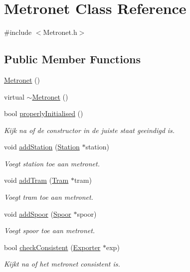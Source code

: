 \hypertarget{class_metronet}{}\section{Metronet Class Reference}
\label{class_metronet}


{\ttfamily \#include $<$Metronet.\+h$>$}

\subsection*{Public Member Functions}
\begin{DoxyCompactItemize}
\item 
\hyperlink{class_metronet_abdd205c39857ed1aabd104a6886cad45}{Metronet} ()
\item 
virtual \hyperlink{class_metronet_afa96be4bf66f8d7dcf3f40a7487d2ea7}{$\sim$\+Metronet} ()
\item 
bool \hyperlink{class_metronet_a3d2adce29a947f162924279b766de645}{properly\+Initialised} ()
\begin{DoxyCompactList}\small\item\em Kijk na of de constructor in de juiste staat geeindigd is. \end{DoxyCompactList}\item 
void \hyperlink{class_metronet_ac7f4069e577cd4dddb1e166923df3ecb}{add\+Station} (\hyperlink{class_station}{Station} $\ast$station)
\begin{DoxyCompactList}\small\item\em Voegt station toe aan metronet. \end{DoxyCompactList}\item 
void \hyperlink{class_metronet_a3a01132772f4a367d83af40a3c02e224}{add\+Tram} (\hyperlink{class_tram}{Tram} $\ast$tram)
\begin{DoxyCompactList}\small\item\em Voegt tram toe aan metronet. \end{DoxyCompactList}\item 
void \hyperlink{class_metronet_a499d8ac62450fec83bc10101de53cd76}{add\+Spoor} (\hyperlink{class_spoor}{Spoor} $\ast$spoor)
\begin{DoxyCompactList}\small\item\em Voegt spoor toe aan metronet. \end{DoxyCompactList}\item 
bool \hyperlink{class_metronet_a0128de167ec0a36e70abd57170b3faed}{check\+Consistent} (\hyperlink{class_exporter}{Exporter} $\ast$exp)
\begin{DoxyCompactList}\small\item\em Kijkt na of het metronet consistent is. \end{DoxyCompactList}\end{DoxyCompactItemize}


